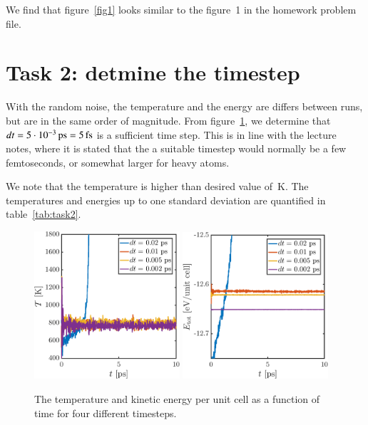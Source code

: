 We find that figure~\ref{fig1} looks similar to the figure~1 in the homework problem file. 

\section*{Task 2: detmine the timestep}


With the random noise, the temperature and the energy are differs between runs, but are in the same order of magnitude. From figure~\ref{fig:task2}, we determine that $dt = \unit[5 \cdot 10^{-3}]{ps} = \unit[5]{fs}$ is a sufficient time step. This is in line with the lecture notes, where it is stated that the a suitable timestep would normally be a few femtoseconds, or somewhat larger for heavy atoms.
  
We note that the temperature is higher than desired value of~\unit[600-800]{K}. The temperatures and energies up to one standard deviation are quantified in table~\ref{tab:task2}. 



\begin{figure}[!ht]
\begin{center}
  \includegraphics[width=0.48\textwidth]{../figures/dt-scan-temperature} 
    \includegraphics[width=0.48\textwidth]{../figures/dt-scan-energy} 
  \caption{The temperature and kinetic energy per unit cell as a function of time for four different timesteps.}
  \label{fig:task2}
\end{center}
\end{figure}



